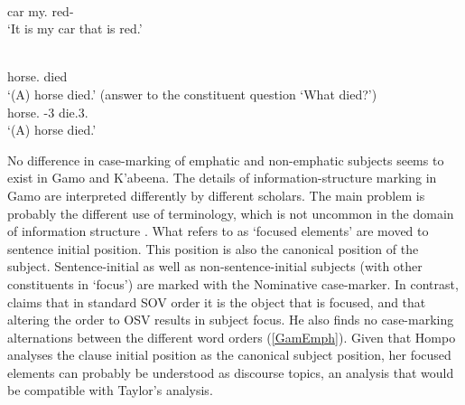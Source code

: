 \begin{exe} \ex\label{HarEmph}
\gll{}  \\
car my.\foc{} red-\fem{}\\
\glt `It is my car that is red.' \end{exe} 

\begin{exe}\ex\label{ArbEmph}
\begin{xlist}\ex\gll {} \\
horse.\pred{} died\\
\glt `(A) horse died.' (answer to the constituent question `What died?')
\ex\gll {}  \\
horse.\nom{} \pvs{}-3\sg{} die.3\sg{}.\fem{}\\
\glt `(A) horse died.'
\end{xlist} 
\end{exe}

No difference in case-marking of emphatic and non-emphatic subjects seems to exist in Gamo and K'abeena. 
The details of information-structure marking in Gamo are interpreted differently by different scholars. 
The main problem is probably the different use of terminology, which is not uncommon in the domain of information structure \citep[262]{Payne:1997}.
What \citet[359--360]{Hompo:1990} refers to as `focused elements' are moved to sentence initial position. 
This position is also the canonical position of the subject. 
Sentence-initial as well as non-sentence-initial subjects (with other constituents in `focus') are marked with the Nominative case-marker.
In contrast, \citet[222]{Taylor:1994} claims that in standard SOV order it is the object that is focused, and that altering the order to OSV results in subject focus. 
He also finds no case-marking alternations between the different word orders (\ref{GamEmph}). 
Given that Hompo analyses the clause initial position as the canonical subject position, her focused elements can probably be understood as discourse topics, an analysis that would be compatible with Taylor's analysis.   %

